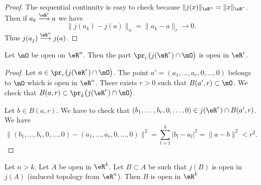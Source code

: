 \begin{proof}
	The sequential continuity is easy to check because \( \| j(x) \|_{\eR^n}=\| x \|_{\eR^r}\). Then if \( a_k\stackrel{ \eR^r}{\longrightarrow} a\) we have
	\begin{equation}
		\| j(a_k)-j(a) \|_n=\| a_k-a \|_r\to 0.
	\end{equation}
	Thus \( j(a_j)\stackrel{ \eR^n}{\longrightarrow} j(a)\).
\end{proof}

\begin{lemma}	\label{LEMooURMPooEBfsTF}
	Let \( \mO\) be open on \( \eR^n\). Then the part \( \pr_r\big( j(\eR^r)\cap \mO \big)\) is open in \( \eR^r\).
\end{lemma}

\begin{proof}
	Let \( a\in\pr_r\big( j(\eR^r)\cap \mO \big)\). The point \( a'=(a_1,\ldots,a_r,0,\ldots,0)\) belongs to \( \mO\) which is open in \( \eR^n\). There exists \( r>0\) such that \( B(a',r)\subset\mO\). We check that \( B(a,r)\subset \pr_k\big( j(\eR^r)\cap\mO \big)\).

	Let \( b\in B(a,r)\). We have to check that \( (b_1,\ldots,b_r,0,\ldots,0)\in j(\eR^r)\cap B(a',r)\). We have
	\begin{equation}
		\| (b_1,\ldots,b_r,0,\ldots,0)-(a_1,\ldots,a_r,0,\ldots,0) \|^2=\sum_{l=1}^k| b_l-a_l |^2=\| a-b \|^2<r^2.
	\end{equation}
\end{proof}

\begin{lemma}	\label{LEMooBIYBooHTFNsQ}
	Let \( n>k\). Let \( A\) be open in \( \eR^k\). Let \( B\subset A\) be such that \( j(B)\) is open in \( j(A)\) (induced topology from \( \eR^n\)). Then \( B\) is open in \( \eR^k\)
\end{lemma}

